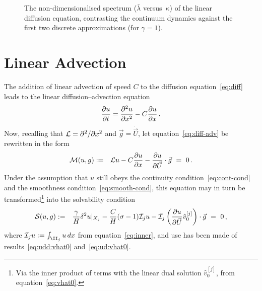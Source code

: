 \documentclass[12pt,a5paper]{article}
\begin{document}
\begin{figure}[hbt]
\centering
{}
\caption{The  non-dimensionalised spectrum ($\bar{\lambda}$ versus~$\kappa$) of the linear diffusion equation, contrasting the 
continuum dynamics against the first two discrete approximations (for $\gamma=1$).}
\label{fig:spec:2nd-order:nd}
\end{figure}

\section{Linear Advection}\label{sec:lin-adv}
The addition of linear advection of speed $C$ to the diffusion equation~\eqref{eq:diff} leads to the
linear diffusion--advection equation
\begin{eqnarray}
	\D tu = \DD xu - C\D xu\,.
	\label{eq:diff-adv}
\end{eqnarray}
Now, recalling that ${\cal L}=\DD{x}{}$ and $\vec{g}=\dot{\vec{U}}$, let equation~\eqref{eq:diff-adv} be rewritten in the form
\begin{eqnarray}
{\cal M}(u,g) & := & {\cal L}u-C\D xu-\D{\vec{U}}{u}\cdot\vec{g}~=~0\,.
\label{eq:Mug}
\end{eqnarray}
Under the assumption that $u$ still obeys the continuity condition~\eqref{eq:cont-cond} and the smoothness condition~\eqref{eq:smooth-cond}, this equation may in turn be transformed\footnote{Via the inner product of terms with the
linear dual solution $\hat{v}_0^{[j]}$, from equation~\eqref{eq:vhat0}.} into the solvability condition
\begin{eqnarray}
       {\cal S}(u,g) & := & 
          \frac{\gamma}{H}\delta^2u|_{X_j} - \frac{C}{H}(\sigma-1){\cal I}_j u
	-{\cal I}_j\left(\D {\vec U}u\hat{v}_0^{[j]}\right)\cdot\vec{g}~=~0 \,,
\label{eq:Sug}
\end{eqnarray}
where ${\cal I}_j u := \int_{\II_j}u\,dx$
from equation~\eqref{eq:inner}, and
use has been made of results~\eqref{eq:udd:vhat0} and~\eqref{eq:ud:vhat0}.
\end{document}
